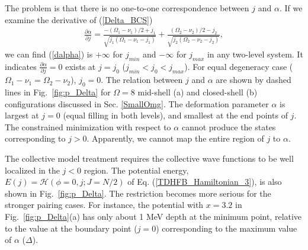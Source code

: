 \documentclass[11pt]{book} %
\begin{document}
The problem is that
there is no one-to-one correspondence between $j$ and $\alpha$.
If we examine the derivative of (\ref{Delta_BCS})
\begin{align}
\frac{\partial\alpha}{\partial j} = \frac{-(\Omega_1-\nu_1)/2+j_1}{\sqrt{j_1(\Omega_1-\nu_1-j_1)}} + \frac{(\Omega_2-\nu_2)/2-j_2}{\sqrt{j_2(\Omega_2-\nu_2-j_2)}} ,
 \label{dalpha}
\end{align}
we can find (\ref{dalpha}) is $+\infty$ for $j_{min}$ and $-\infty$ for $j_{max}$ in any two-level system. It indicates $\frac{\partial\alpha}{\partial j} =0$ exists at $j=j_0$ ($j_{min}<j_0<j_{max}$). For equal degeneracy case ($\Omega_1-\nu_1=\Omega_2-\nu_2$), $j_0=0$. 
The relation between $j$ and $\alpha$ 
are shown by dashed lines in Fig.~\ref{fig:p_Delta} 
for $\Omega=8$ mid-shell (a) and closed-shell (b) configurations discussed in Sec. \ref{SmallOmg}.
The deformation parameter $\alpha$ is largest at $j=0$ (equal filling in both levels),
and smallest at the end points of $j$.
The constrained minimization with respect to $\alpha$ cannot 
produce the states corresponding to $j>0$.
Apparently, we cannot map the entire region of $j$ to $\alpha$.

The collective model treatment
requires the collective wave functions to be well localized
in the $j<0$ region.
The potential energy, $E(j)=\mathcal{H}(\phi=0,j;J=N/2)$ of
Eq. (\ref{TDHFB_Hamiltonian_3}), is also shown in
Fig.~\ref{fig:p_Delta}.
The restriction becomes more serious for the stronger pairing cases.
For instance, the potential with $x=3.2$ in Fig.~\ref{fig:p_Delta}(a)
has only about 1 MeV depth at the minimum point, relative to the value
at the boundary point ($j=0$) corresponding to
the maximum value of $\alpha$ ($\Delta$).
\end{document}
